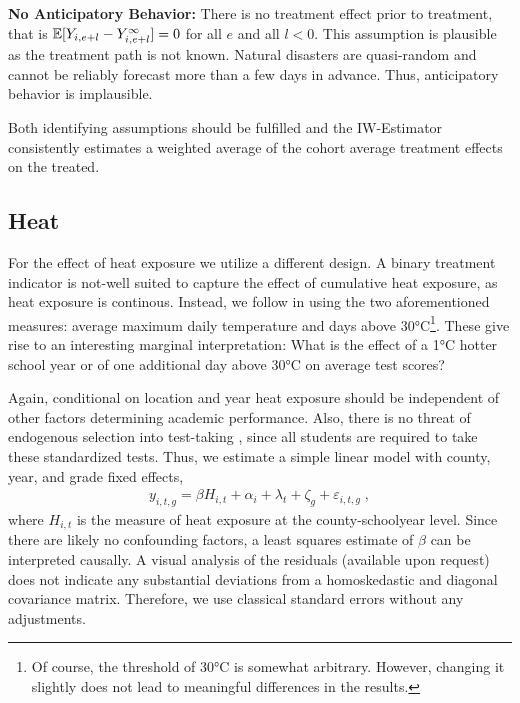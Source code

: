 \textbf{No Anticipatory Behavior:} There is no treatment effect prior to treatment, that is $\mathbb{E}[Y_{i, e+l} - Y_{i, e+l}^{\infty}] = 0$ for all $e$ and all $l < 0$. This assumption is plausible as the treatment path is not known. Natural disasters are quasi-random and cannot be reliably forecast more than a few days in advance. Thus, anticipatory behavior is implausible.

Both identifying assumptions should be fulfilled and the IW-Estimator consistently estimates a weighted average of the cohort average treatment effects on the treated.


\subsection{Heat}

For the effect of heat exposure we utilize a different design. A binary treatment indicator is not-well suited to capture the effect of cumulative heat exposure, as heat exposure is continous. Instead, we follow \cite{Goodman_2020} in using the two aforementioned measures: average maximum daily temperature and days above 30°C\footnote{Of course, the threshold of 30°C is somewhat arbitrary. However, changing it slightly does not lead to meaningful differences in the results.}. These give rise to an interesting marginal interpretation: What is the effect of a 1°C hotter school year or of one additional day above 30°C on average test scores?

Again, conditional on location and year heat exposure should be independent of other factors determining academic performance. Also, there is no threat of endogenous selection into test-taking \citep[as in][]{Goodman_2020}, since all students are required to take these standardized tests. Thus, we estimate a simple linear model with county, year, and grade fixed effects,
\begin{align}
	y_{i, t, g} = \beta H_{i, t} + \alpha_i + \lambda_t + \zeta_g + \varepsilon_{i, t, g} \;,
\end{align}
where $H_{i, t}$ is the measure of heat exposure at the county-schoolyear level. Since there are likely no confounding factors, a least squares estimate of $\beta$ can be interpreted causally. A visual analysis of the residuals (available upon request) does not indicate any substantial deviations from a homoskedastic and diagonal covariance matrix. Therefore, we use classical standard errors without any adjustments.







